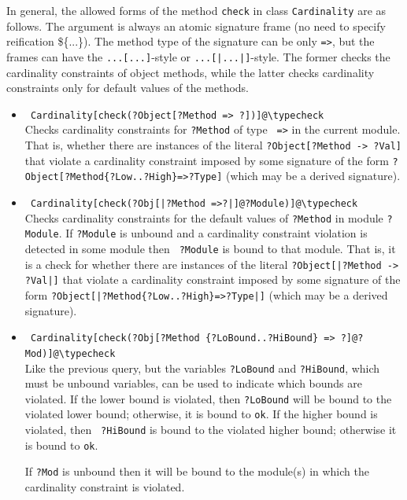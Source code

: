 \documentclass[11pt]{article}
\newcommand{\bs}{\textbackslash}
\begin{document}
In general, the allowed forms of the method {\tt check} in class
{\tt Cardinality}  are as
follows.  The argument is always an atomic signature frame (no need to specify
reification \$\{...\}).  The method type of the signature can be only
{\tt =>}, but the frames can have the \texttt{...[...]}-style or
\texttt{...[|...|]}-style. The former checks the cardinality
constraints of object methods, while the latter checks
cardinality constraints only for default values of the methods.
\begin{itemize}
\item
  {\tt
    Cardinality[check(?Object[?Method => ?])]@\bs{}typecheck}
  \\ 
  Checks cardinality constraints for {\tt ?Method} of type {\tt
    =>} in the current module.
  That is, whether there are instances of the literal \texttt{?Object[?Method ->
    ?Val]} that violate a cardinality constraint imposed by some signature
  of the form \texttt{?Object[?Method\{?Low..?High\}=>?Type]} (which may be a
  derived signature).
\item
  {\tt
    Cardinality[check(?Obj[|?Method =>?|]@?Module)]@\bs{}typecheck}\\ 
  Checks cardinality constraints for the default values
  of {\tt ?Method} in module {\tt ?Module}. If {\tt ?Module} is unbound and a
  cardinality constraint violation is detected in some module then {\tt
    ?Module} is bound to that module.  
  That is, it is a check for
   whether there are instances of the literal \texttt{?Object[|?Method ->
     ?Val|]} that violate a cardinality constraint imposed by some signature
   of the form \texttt{?Object[|?Method\{?Low..?High\}=>?Type|]} (which may be a
  derived signature).
 \item {\tt
    Cardinality[check(?Obj[?Method \{?LoBound..?HiBound\} => ?]@?Mod)]@\bs{}typecheck}\\
  Like the previous query, but the variables {\tt ?LoBound} and
  {\tt ?HiBound}, which must be unbound variables, can be used to
  indicate which bounds are violated.  If the lower bound is violated, then
  {\tt ?LoBound} will be bound to the violated lower bound; otherwise, it
  is bound to {\tt ok}.  If the higher bound is violated, then {\tt
    ?HiBound} is bound to the violated higher bound; otherwise it is
  bound to {\tt ok}. 

  If {\tt ?Mod} is unbound then it will be bound to the module(s) in which
  the cardinality constraint is violated.


\end{itemize}
\end{document}
